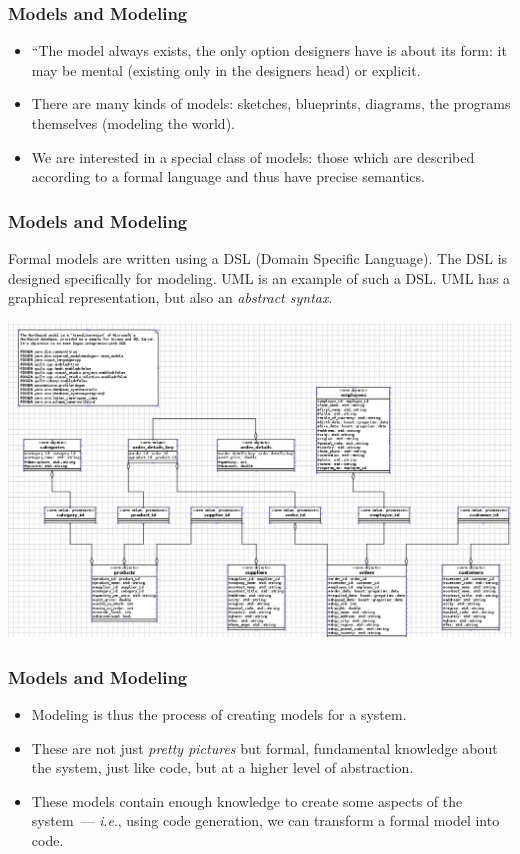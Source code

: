 \documentclass{beamer}
\newcommand{\ie}{\textit{i}.\textit{e}., }
\begin{document}
\begin{frame}
\frametitle{Models and Modeling}

\begin{itemize}
\item ``The model always exists, the only option designers have is
  about its form: it may be mental (existing only in the designers
  head) or explicit.\cite{brambilla2012model}
  \pause
\item There are many kinds of models: sketches, blueprints, diagrams,
  the programs themselves (modeling the world).
  \pause
\item We are interested in a special class of models: those which are
  described according to a formal language and thus have precise
  semantics.
\end{itemize}

\end{frame}

\begin{frame}
\frametitle{Models and Modeling}

Formal models are written using a DSL (Domain Specific Language). The
DSL is designed specifically for modeling. UML is an example of such a
DSL. UML has a graphical representation, but also an \emph{abstract
  syntax}.

\begin{center}
  \includegraphics[scale=0.2]{images/northwind_diagram.png}
\end{center}

\end{frame}

\begin{frame}
\frametitle{Models and Modeling}

\begin{itemize}
\item Modeling is thus the process of creating models for a system.
  \pause
\item These are not just \emph{pretty pictures} but formal,
  fundamental knowledge about the system, just like code, but at a
  higher level of abstraction.
  \pause
\item These models contain enough knowledge to create some aspects of
  the system~--- \ie using code generation, we can transform a formal
  model into code.
\end{itemize}

\end{frame}
\end{document}

